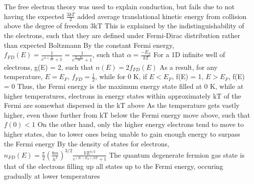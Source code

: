 \documentclass[11 pt, twoside]{article}
\newenvironment{outline*}
{
	\begin{outline}[enumerate]
	}
	{\end{outline}
}
\begin{document}
\begin{outline*}
\1 The free electron theory was used to explain conduction, but fails due to not having the expected $\frac{3kT}{2}$ added average translational kinetic energy from collision above the degree of freedom 3kT
	\2 This is explained by the indistinguishability of the electrons, such that they are defined under Fermi-Dirac distribution rather than expected Boltzmann 
	\2 By the constant Fermi energy, $f_{FD}(E) = \frac{1}{e^{\alpha + \frac{E}{kT}} + 1} = \frac{1}{e^{\frac{E - E_F}{kT}} + 1}$, such that $\alpha = \frac{-E_F}{kT}$
		\3 For a 1D infinite well of electrons, g(E) = 2, such that $n(E) = 2f_{FD}(E)$
		\3 As a result, for any temperature, $E = E_F$, $f_{FD} = \frac{1}{2}$, while for 0 K, if $E < E_F$, f(E) = 1, $E > E_F$, f(E) = 0
		\3 Thus, the Fermi energy is the maximum energy state filled at 0 K, while at higher temperatures, electrons in energy states within approximately kT of the Fermi are somewhat dispersed in the kT above
			\4 As the temperature gets vastly higher, even those further from kT below the Fermi energy move above, such that $f(0) < 1$
			\4 On the other hand, only the higher energy electrons tend to move to higher states, due to lower ones being unable to gain enough energy to surpass the Fermi energy
		\3 By the density of states for electrons, $n_{FD}(E) = \frac{\pi}{2}(\frac{8m}{h^2})^{3/2}\frac{VE^{1/2}}{e^{(E - E_F)/kT} + 1}$
	\2 The quantum degenerate fermion gas state is that of the electrons filling up all states up to the Fermi energy, occuring gradually at lower temperatures
\end{outline*}
\end{document}
